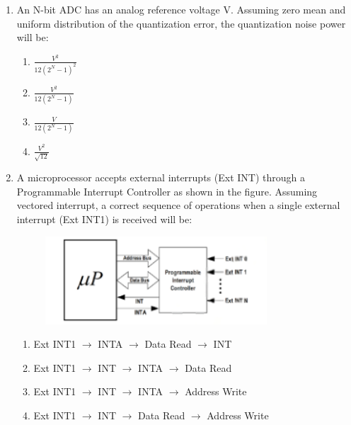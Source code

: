 \documentclass[journal,12pt,onecolumn]{IEEEtran}
\theoremstyle{remark}
\begin{document}
\begin{enumerate}
    \item An N-bit ADC has an analog reference voltage V. Assuming zero mean and uniform distribution of the quantization error, the quantization noise power will be:
    \begin{multicols}{2}
        \begin{enumerate}
            \item $\frac{V^2}{12(2^N-1)^2}$
            \item $\frac{V^2}{12(2^N-1)}$
            \item $\frac{V}{12(2^N-1)}$
            \item $\frac{V^2}{\sqrt{12}}$
        \end{enumerate}
    \end{multicols}
    
    \item A microprocessor accepts external interrupts (Ext INT) through a Programmable Interrupt Controller as shown in the figure. Assuming vectored interrupt, a correct sequence of operations when a single external interrupt (Ext INT1) is received will be:
    \begin{figure}[H]
        \centering
        \includegraphics[width=0.6\columnwidth]{q42}
        \caption*{}
        \label{fig:placeholder}
    \end{figure}
    \begin{enumerate}
        \item Ext INT1 $\rightarrow$ INTA $\rightarrow$ Data Read $\rightarrow$ INT
        \item Ext INT1 $\rightarrow$ INT $\rightarrow$ INTA $\rightarrow$ Data Read
        \item Ext INT1 $\rightarrow$ INT $\rightarrow$ INTA $\rightarrow$ Address Write
        \item Ext INT1 $\rightarrow$ INT $\rightarrow$ Data Read $\rightarrow$ Address Write
    \end{enumerate}

    \vspace{0.5cm}


\end{enumerate}
\end{document}

